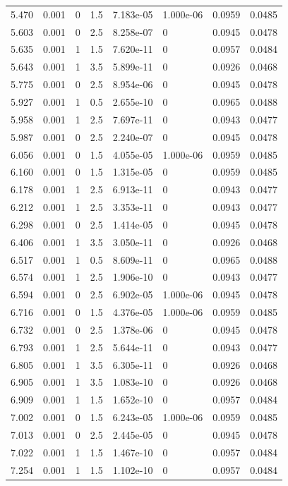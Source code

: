 \documentclass[preview]{standalone}
\begin{document}
{{{\begin{tabular}{L{1.2cm}C{1.2cm} C{0.3cm}C{0.5cm} C{1.4cm}C{1.4cm} C{1.4cm}C{1.4cm}}
  5.470  &  0.001  & 0     & 1.5 &  7.183e-05  & 1.000e-06  & 0.0959 &  0.0485   \\ 
  5.603  &  0.001  & 0     & 2.5 &  8.258e-07  & 0  & 0.0945 &  0.0478   \\ 
  5.635  &  0.001  & 1     & 1.5 &  7.620e-11  & 0  & 0.0957 &  0.0484   \\ 
  5.643  &  0.001  & 1     & 3.5 &  5.899e-11  & 0  & 0.0926 &  0.0468   \\ 
  5.775  &  0.001  & 0     & 2.5 &  8.954e-06  & 0  & 0.0945 &  0.0478   \\ 
  5.927  &  0.001  & 1     & 0.5 &  2.655e-10  & 0  & 0.0965 &  0.0488   \\ 
  5.958  &  0.001  & 1     & 2.5 &  7.697e-11  & 0  & 0.0943 &  0.0477   \\ 
  5.987  &  0.001  & 0     & 2.5 &  2.240e-07  & 0  & 0.0945 &  0.0478   \\ 
  6.056  &  0.001  & 0     & 1.5 &  4.055e-05  & 1.000e-06  & 0.0959 &  0.0485   \\ 
  6.160  &  0.001  & 0     & 1.5 &  1.315e-05  & 0  & 0.0959 &  0.0485   \\ 
  6.178  &  0.001  & 1     & 2.5 &  6.913e-11  & 0  & 0.0943 &  0.0477   \\ 
  6.212  &  0.001  & 1     & 2.5 &  3.353e-11  & 0  & 0.0943 &  0.0477   \\ 
  6.298  &  0.001  & 0     & 2.5 &  1.414e-05  & 0  & 0.0945 &  0.0478   \\ 
  6.406  &  0.001  & 1     & 3.5 &  3.050e-11  & 0  & 0.0926 &  0.0468   \\ 
  6.517  &  0.001  & 1     & 0.5 &  8.609e-11  & 0  & 0.0965 &  0.0488   \\ 
  6.574  &  0.001  & 1     & 2.5 &  1.906e-10  & 0  & 0.0943 &  0.0477   \\ 
  6.594  &  0.001  & 0     & 2.5 &  6.902e-05  & 1.000e-06  & 0.0945 &  0.0478   \\ 
  6.716  &  0.001  & 0     & 1.5 &  4.376e-05  & 1.000e-06  & 0.0959 &  0.0485   \\ 
  6.732  &  0.001  & 0     & 2.5 &  1.378e-06  & 0  & 0.0945 &  0.0478   \\ 
  6.793  &  0.001  & 1     & 2.5 &  5.644e-11  & 0  & 0.0943 &  0.0477   \\ 
  6.805  &  0.001  & 1     & 3.5 &  6.305e-11  & 0  & 0.0926 &  0.0468   \\ 
  6.905  &  0.001  & 1     & 3.5 &  1.083e-10  & 0  & 0.0926 &  0.0468   \\ 
  6.909  &  0.001  & 1     & 1.5 &  1.652e-10  & 0  & 0.0957 &  0.0484   \\ 
  7.002  &  0.001  & 0     & 1.5 &  6.243e-05  & 1.000e-06  & 0.0959 &  0.0485   \\ 
  7.013  &  0.001  & 0     & 2.5 &  2.445e-05  & 0  & 0.0945 &  0.0478   \\ 
  7.022  &  0.001  & 1     & 1.5 &  1.467e-10  & 0  & 0.0957 &  0.0484   \\ 
  7.254  &  0.001  & 1     & 1.5 &  1.102e-10  & 0  & 0.0957 &  0.0484   \\ 
\hline 
\end{tabular} 

}}}
\end{document}
